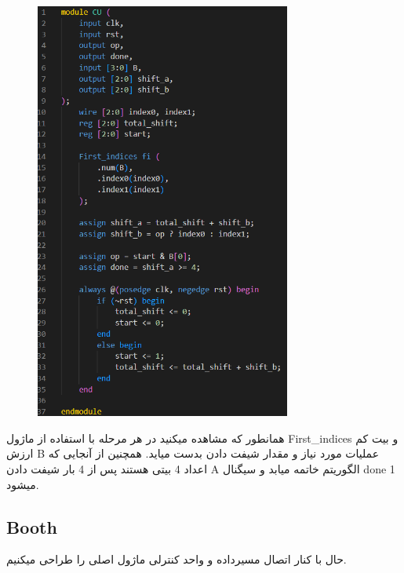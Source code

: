 \documentclass{article}
\begin{document}
\begin{figure}[H]
    \centering
    \includegraphics[width=0.75\textwidth]{CU.png}
\end{figure}

همانطور که مشاهده میکنید 
در هر مرحله با استفاده از ماژول 
First\_indices
و بیت کم ارزش 
B
عملیات مورد نیاز و مقدار شیفت دادن بدست میاید.
همچنین از آنجایی که اعداد 4 بیتی هستند پس از 4 بار شیفت دادن 
A
الگوریتم خاتمه میابد و سیگنال 
done 
1 میشود.

\newpage
\subsection{Booth}
حال با کنار اتصال مسیرداده و واحد کنترلی
ماژول اصلی را طراحی میکنیم.
\end{document}
